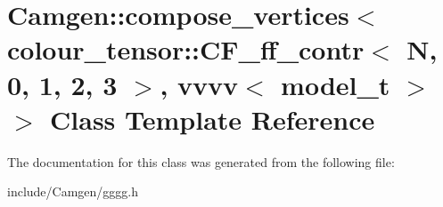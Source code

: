 \hypertarget{a00095}{}\section{Camgen\+:\+:compose\+\_\+vertices$<$ colour\+\_\+tensor\+:\+:C\+F\+\_\+ff\+\_\+contr$<$ N, 0, 1, 2, 3 $>$, vvvv$<$ model\+\_\+t $>$ $>$ Class Template Reference}
\label{a00095}


The documentation for this class was generated from the following file\+:\begin{DoxyCompactItemize}
\item 
include/\+Camgen/gggg.\+h\end{DoxyCompactItemize}
